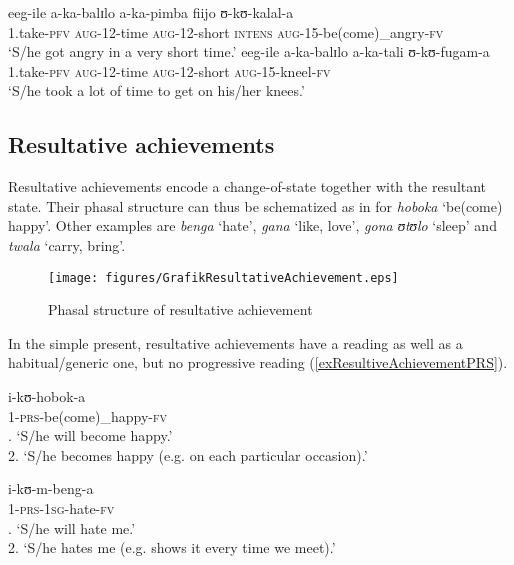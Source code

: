 \begin{exe}
\ex  \gll eeg-ile a-ka-balɪlo a-ka-pimba fiijo ʊ-kʊ-kalal-a\\
1.take-\textsc{pfv} \textsc{aug}-12-time \textsc{aug}-12-short \textsc{intens} \textsc{aug}-15-be(come)\_angry-\textsc{fv}\\
\glt \lq S/he got angry in a very short time.'
\ex  \gll eeg-ile a-ka-balɪlo a-ka-tali ʊ-kʊ-fugam-a\\
1.take-\textsc{pfv} \textsc{aug}-12-time \textsc{aug}-12-short \textsc{aug}-15-kneel-\textsc{fv}\\
\glt \lq S/he took a lot of time to get on his/her knees.'
\end{exe}
\subsection{Resultative achievements}\label{VerbalClassResultativeAchievement}
Resultative achievements encode a change-of-state together with the resultant state. Their phasal structure can thus be schematized as in  for \textit{hoboka} `be(come) happy'. Other examples are \textit{benga} \lq hate', \textit{gana} \lq like, love', \textit{gona ʊtʊlo} \lq sleep' and \textit{twala} \lq carry, bring'.

\begin{figure}[h]
\begin{center}
\texttt{[image: figures/GrafikResultativeAchievement.eps]}
\caption{Phasal structure of resultative achievement}
\label{FigureResultativeAchievement}
\end{center}
\end{figure}

In the simple present, resultative achievements have a  reading as well as a habitual/generic one, but no progressive reading (\ref{exResultiveAchievementPRS}).

\begin{exe}
\ex \label{exResultiveAchievementPRS} \begin{xlist}
\ex \gll i-kʊ-hobok-a\\
1-\textsc{prs}-be(come)\_happy-\textsc{fv}\\
. `S/he will become happy.'\\2. `S/he becomes happy (e.g. on each particular occasion).' 

\ex \gll i-kʊ-m-beng-a\\
1-\textsc{prs}-\textsc{1sg}-hate-\textsc{fv}\\
. \lq S/he will hate me.'\\
2. \lq S/he hates me (e.g. shows it every time we meet).'

\end{xlist}
\end{exe}

